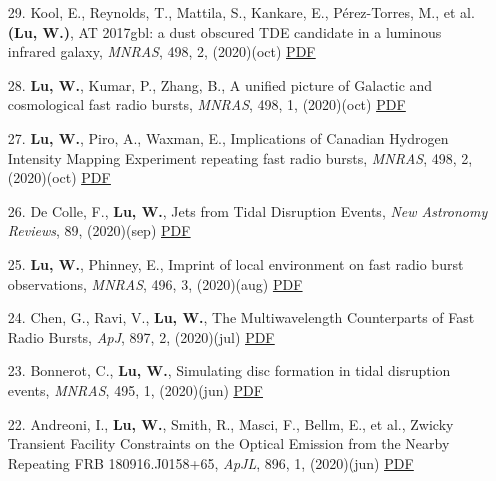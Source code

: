 \begin{itemize}[leftmargin=0.65cm]
\vspace{-0.1cm}
\item[29.]{Kool, E., Reynolds, T., Mattila, S., Kankare, E., P{\'e}rez-Torres, M., et al. {\bf (Lu, W.)}, {AT 2017gbl: a dust obscured TDE candidate in a luminous infrared galaxy}, {\it MNRAS}, 498, 2, (2020)(oct) \href{https://ui.adsabs.harvard.edu/abs/2020MNRAS.498.2167K}{\underline{PDF}}}

\vspace{-0.1cm}
\item[28.]{{\bf Lu, W.}, Kumar, P., Zhang, B., {A unified picture of Galactic and cosmological fast radio bursts}, {\it MNRAS}, 498, 1, (2020)(oct) \href{https://ui.adsabs.harvard.edu/abs/2020MNRAS.498.1397L}{\underline{PDF}}}

\vspace{-0.1cm}
\item[27.]{{\bf Lu, W.}, Piro, A., Waxman, E., {Implications of Canadian Hydrogen Intensity Mapping Experiment repeating fast radio bursts}, {\it MNRAS}, 498, 2, (2020)(oct) \href{https://ui.adsabs.harvard.edu/abs/2020MNRAS.498.1973L}{\underline{PDF}}}

\vspace{-0.1cm}
\item[26.]{De Colle, F., {\bf Lu, W.}, {Jets from Tidal Disruption Events}, {\it New Astronomy Reviews}, 89, (2020)(sep) \href{https://ui.adsabs.harvard.edu/abs/2020NewAR..8901538D}{\underline{PDF}}}

\vspace{-0.1cm}
\item[25.]{{\bf Lu, W.}, Phinney, E., {Imprint of local environment on fast radio burst observations}, {\it MNRAS}, 496, 3, (2020)(aug) \href{https://ui.adsabs.harvard.edu/abs/2020MNRAS.496.3308L}{\underline{PDF}}}

\vspace{-0.1cm}
\item[24.]{Chen, G., Ravi, V., {\bf Lu, W.}, {The Multiwavelength Counterparts of Fast Radio Bursts}, {\it ApJ}, 897, 2, (2020)(jul) \href{https://ui.adsabs.harvard.edu/abs/2020ApJ...897..146C}{\underline{PDF}}}

\vspace{-0.1cm}
\item[23.]{Bonnerot, C., {\bf Lu, W.}, {Simulating disc formation in tidal disruption events}, {\it MNRAS}, 495, 1, (2020)(jun) \href{https://ui.adsabs.harvard.edu/abs/2020MNRAS.495.1374B}{\underline{PDF}}}

\vspace{-0.1cm}
\item[22.]{Andreoni, I., {\bf Lu, W.}, Smith, R., Masci, F., Bellm, E., et al., {Zwicky Transient Facility Constraints on the Optical Emission from the Nearby Repeating FRB 180916.J0158+65}, {\it ApJL}, 896, 1, (2020)(jun) \href{https://ui.adsabs.harvard.edu/abs/2020ApJ...896L...2A}{\underline{PDF}}}


\end{itemize}
